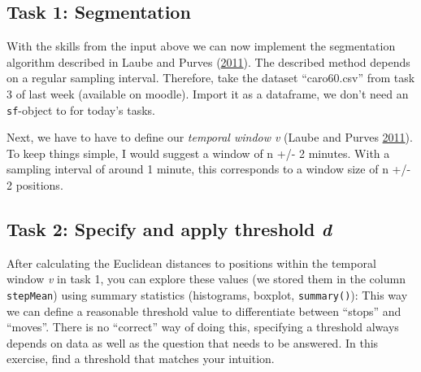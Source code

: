 \documentclass[]{book}
\newenvironment{Shaded}{\begin{snugshade}}{\end{snugshade}}
\newcommand{\KeywordTok}[1]{\textcolor[rgb]{0.13,0.29,0.53}{\textbf{#1}}}
\newcommand{\DataTypeTok}[1]{\textcolor[rgb]{0.13,0.29,0.53}{#1}}
\newcommand{\StringTok}[1]{\textcolor[rgb]{0.31,0.60,0.02}{#1}}
\newcommand{\OperatorTok}[1]{\textcolor[rgb]{0.81,0.36,0.00}{\textbf{#1}}}
\newcommand{\NormalTok}[1]{#1}
\begin{document}
\begin{Shaded}
\end{Shaded}

\subsection{Task 1: Segmentation}\label{task-1-segmentation}

With the skills from the input above we can now implement the
segmentation algorithm described in Laube and Purves
(\protect\hyperlink{ref-laube2011}{2011}). The described method depends
on a regular sampling interval. Therefore, take the dataset
``caro60.csv'' from task 3 of last week (available on moodle). Import it
as a dataframe, we don't need an \texttt{sf}-object to for today's
tasks.

Next, we have to have to define our \emph{temporal window v} (Laube and
Purves \protect\hyperlink{ref-laube2011}{2011}). To keep things simple,
I would suggest a window of n +/- 2 minutes. With a sampling interval of
around 1 minute, this corresponds to a window size of n +/- 2 positions.

\subsection{\texorpdfstring{Task 2: Specify and apply threshold
\emph{d}}{Task 2: Specify and apply threshold d}}\label{task-2-specify-and-apply-threshold-d}

After calculating the Euclidean distances to positions within the
temporal window \emph{v} in task 1, you can explore these values (we
stored them in the column \texttt{stepMean}) using summary statistics
(histograms, boxplot, \texttt{summary()}): This way we can define a
reasonable threshold value to differentiate between ``stops'' and
``moves''. There is no ``correct'' way of doing this, specifying a
threshold always depends on data as well as the question that needs to
be answered. In this exercise, find a threshold that matches your
intuition.
\end{document}
